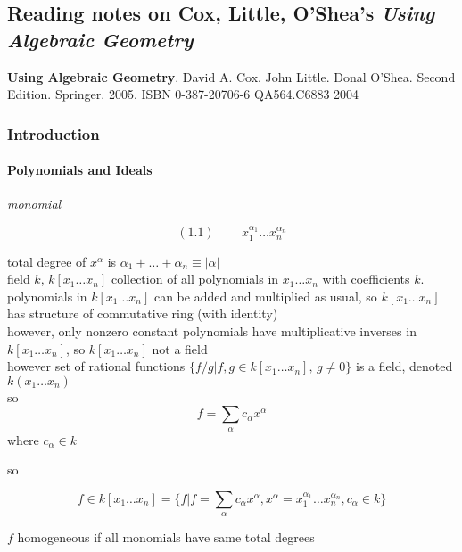 \documentclass[10pt]{amsart}
\begin{document}
\begin{multicols*}{2}
\part{Reading notes on Cox, Little, O'Shea's \emph{Using Algebraic Geometry}}

\textbf{Using Algebraic Geometry}.  David A. Cox.  John Little. Donal O'Shea. Second Edition.  Springer.  2005.  ISBN 0-387-20706-6 QA564.C6883 2004

\section{ Introduction }

\subsection{ Polynomials and Ideals }

\emph{monomial } 

\begin{equation}
  (1.1) \quad \quad \, x_1^{\alpha_1} \dots x_n^{\alpha_n}
\end{equation}

total degree of $x^{\alpha}$ is $\alpha_1 + \dots + \alpha_n \equiv |\alpha|$ \\



field $k$, $k[x_1 \dots x_n]$ collection of all polynomials in $x_1 \dots x_n$ with coefficients $k$.   \\

polynomials in $k[x_1 \dots x_n]$ can be added and multiplied as usual, so $k[x_1 \dots x_n]$ has structure of commutative ring (with identity) \\
however, only nonzero constant polynomials have multiplicative inverses in $k[x_1 \dots x_n]$, so $k[x_1 \dots x_n]$ not a field \\
\quad however set of rational functions $\lbrace f/g | f,g \in k[x_1 \dots x_n], \, g\neq 0\rbrace$ is a field, denoted $k(x_1 \dots x_n)$ \\

so
\[
f = \sum_{\alpha} c_{\alpha}x^{\alpha}
\]
where $c_{\alpha} \in k$

so

\[
f \in k [x_1 \dots x_n ] = \lbrace f | f = \sum_{\alpha} c_{\alpha} x^{\alpha} , x^{\alpha} = x_1^{\alpha_1} \dots x_n^{\alpha_n}, c_{\alpha} \in k \rbrace
\]

$f$ homogeneous if all monomials have same total degrees


\end{multicols*}
\end{document}
